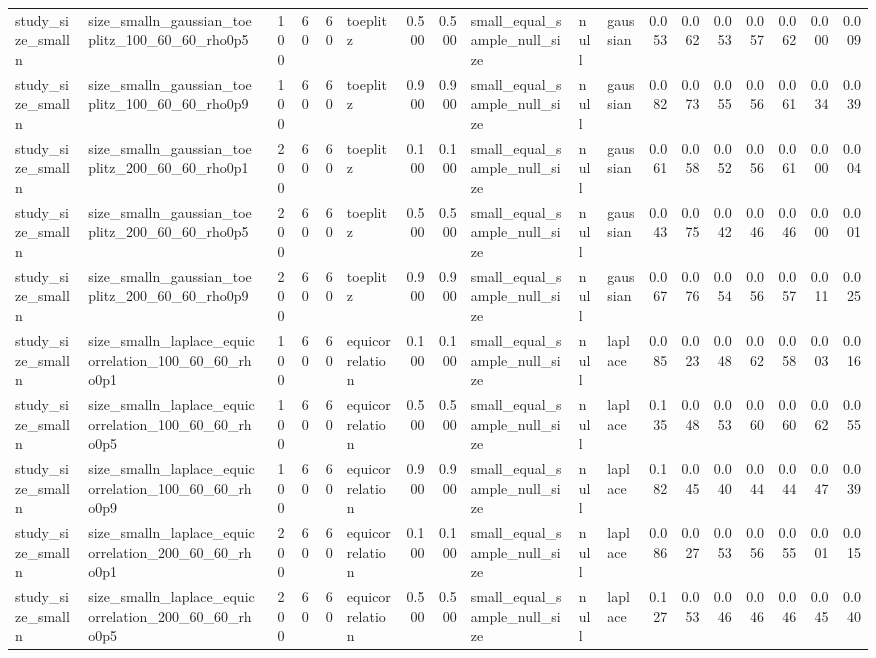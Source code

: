 \begin{tabular}{llrrrlrrlllrrrrrrr}
study\_size\_smalln & size\_smalln\_gaussian\_toeplitz\_100\_60\_60\_rho0p5 & 100 & 60 & 60 & toeplitz & 0.500 & 0.500 & small\_equal\_sample\_null\_size & null & gaussian & 0.053 & 0.062 & 0.053 & 0.057 & 0.062 & 0.000 & 0.009 \\
study\_size\_smalln & size\_smalln\_gaussian\_toeplitz\_100\_60\_60\_rho0p9 & 100 & 60 & 60 & toeplitz & 0.900 & 0.900 & small\_equal\_sample\_null\_size & null & gaussian & 0.082 & 0.073 & 0.055 & 0.056 & 0.061 & 0.034 & 0.039 \\
study\_size\_smalln & size\_smalln\_gaussian\_toeplitz\_200\_60\_60\_rho0p1 & 200 & 60 & 60 & toeplitz & 0.100 & 0.100 & small\_equal\_sample\_null\_size & null & gaussian & 0.061 & 0.058 & 0.052 & 0.056 & 0.061 & 0.000 & 0.004 \\
study\_size\_smalln & size\_smalln\_gaussian\_toeplitz\_200\_60\_60\_rho0p5 & 200 & 60 & 60 & toeplitz & 0.500 & 0.500 & small\_equal\_sample\_null\_size & null & gaussian & 0.043 & 0.075 & 0.042 & 0.046 & 0.046 & 0.000 & 0.001 \\
study\_size\_smalln & size\_smalln\_gaussian\_toeplitz\_200\_60\_60\_rho0p9 & 200 & 60 & 60 & toeplitz & 0.900 & 0.900 & small\_equal\_sample\_null\_size & null & gaussian & 0.067 & 0.076 & 0.054 & 0.056 & 0.057 & 0.011 & 0.025 \\
study\_size\_smalln & size\_smalln\_laplace\_equicorrelation\_100\_60\_60\_rho0p1 & 100 & 60 & 60 & equicorrelation & 0.100 & 0.100 & small\_equal\_sample\_null\_size & null & laplace & 0.085 & 0.023 & 0.048 & 0.062 & 0.058 & 0.003 & 0.016 \\
study\_size\_smalln & size\_smalln\_laplace\_equicorrelation\_100\_60\_60\_rho0p5 & 100 & 60 & 60 & equicorrelation & 0.500 & 0.500 & small\_equal\_sample\_null\_size & null & laplace & 0.135 & 0.048 & 0.053 & 0.060 & 0.060 & 0.062 & 0.055 \\
study\_size\_smalln & size\_smalln\_laplace\_equicorrelation\_100\_60\_60\_rho0p9 & 100 & 60 & 60 & equicorrelation & 0.900 & 0.900 & small\_equal\_sample\_null\_size & null & laplace & 0.182 & 0.045 & 0.040 & 0.044 & 0.044 & 0.047 & 0.039 \\
study\_size\_smalln & size\_smalln\_laplace\_equicorrelation\_200\_60\_60\_rho0p1 & 200 & 60 & 60 & equicorrelation & 0.100 & 0.100 & small\_equal\_sample\_null\_size & null & laplace & 0.086 & 0.027 & 0.053 & 0.056 & 0.055 & 0.001 & 0.015 \\
study\_size\_smalln & size\_smalln\_laplace\_equicorrelation\_200\_60\_60\_rho0p5 & 200 & 60 & 60 & equicorrelation & 0.500 & 0.500 & small\_equal\_sample\_null\_size & null & laplace & 0.127 & 0.053 & 0.046 & 0.046 & 0.046 & 0.045 & 0.040 \\

\end{tabular}

